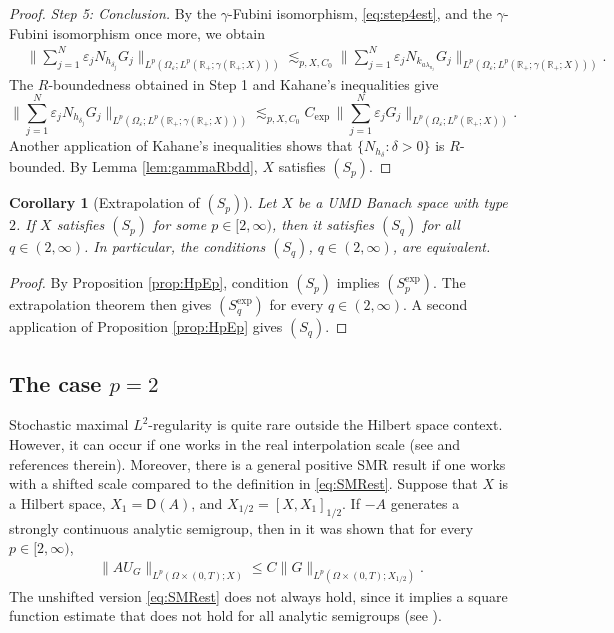 \documentclass{amsart}
\let\leq\leqslant
\theoremstyle{plain}
\theoremstyle{remark}
\theoremstyle{plain}
\newtheorem{corollary}[theorem]{Corollary}
\numberwithin{equation}{section}
\newcommand{\R}{\mathbb R}
\newcommand{\1}{\mathbf 1}
\newcommand{\Dom}{\mathsf{D}}
\begin{document}
\begin{proof}
\smallskip
\emph{Step 5: Conclusion.}
By the $\gamma$-Fubini isomorphism, \eqref{eq:step4est}, and the $\gamma$-Fubini isomorphism once more, we obtain
\begin{align*}
&\Big\|
\sum_{j=1}^N\varepsilon_jN_{h_{\delta_j}}G_j
\Big\|_{L^p(\Omega_\varepsilon;
L^p(\R_+;\gamma(\R_+;X)))}\lesssim_{p,X,C_0}
\Big\|
\sum_{j=1}^N\varepsilon_jN_{k_{a\lambda_{n_j}}}G_j
\Big\|_{L^p(\Omega_\varepsilon;
L^p(\R_+;\gamma(\R_+;X)))}.
\end{align*}
The $R$-boundedness obtained in Step 1 and Kahane's inequalities give
\[
\Big\|
\sum_{j=1}^N\varepsilon_jN_{h_{\delta_j}}G_j
\Big\|_{L^p(\Omega_\varepsilon;
L^p(\R_+;\gamma(\R_+;X)))}
\lesssim_{p,X,C_0} C_{\exp}\,
\Big\|
\sum_{j=1}^N\varepsilon_jG_j
\Big\|_{L^p(\Omega_\varepsilon;L^p(\R_+;X))}.
\]
Another application of Kahane's inequalities shows that
$\{N_{h_\delta}:\delta>0\}$ is $R$-bounded. By Lemma
\ref{lem:gammaRbdd}, $X$ satisfies $(S_p)$.
\end{proof}

\begin{corollary}[Extrapolation of $(S_p)$]
\label{cor:Sp-independent-p}
Let $X$ be a UMD Banach space with type $2$. If $X$ satisfies $(S_p)$ for some $p\in[2,\infty)$, then it satisfies $(S_q)$ for all $q\in(2,\infty)$. In particular, the conditions $(S_q)$, $q\in(2,\infty)$, are equivalent.
\end{corollary}

\begin{proof}
By Proposition \ref{prop:HpEp}, condition $(S_p)$ implies $(S_p^{\exp})$. The extrapolation theorem \cite[Theorem 9.1]{LoVer} then gives $(S_q^{\exp})$ for every $q\in(2,\infty)$. A second application of Proposition \ref{prop:HpEp} gives $(S_q)$.
\end{proof}

\subsection{The case \texorpdfstring{$p=2$}{p=2}}\label{ss:casep2}
Stochastic maximal $L^2$-regularity is quite rare outside the Hilbert space context. However, it can occur if one works in the real interpolation scale (see \cite[Theorem 8.6]{LoVer} and references therein). Moreover, there is a general positive SMR result if one works with a shifted scale compared to the definition in \eqref{eq:SMRest}. Suppose that $X$ is a Hilbert space, $X_1=\Dom(A)$, and $X_{1/2}=[X,X_1]_{1/2}$. If $-A$ generates a strongly continuous analytic semigroup, then in \cite[Theorem 3.13]{AVsurvey} it was shown that for every $p\in [2, \infty)$, 
\begin{align*}
\|A U_G\|_{L^p(\Omega\times (0,T);X)}\leq C \|G\|_{L^p(\Omega\times (0,T);X_{1/2})}.
\end{align*}
The unshifted version \eqref{eq:SMRest} does not always hold, since it implies a square function estimate that does not hold for all analytic semigroups (see \cite[Lemma 4.2]{AV19}). 
\end{document}
